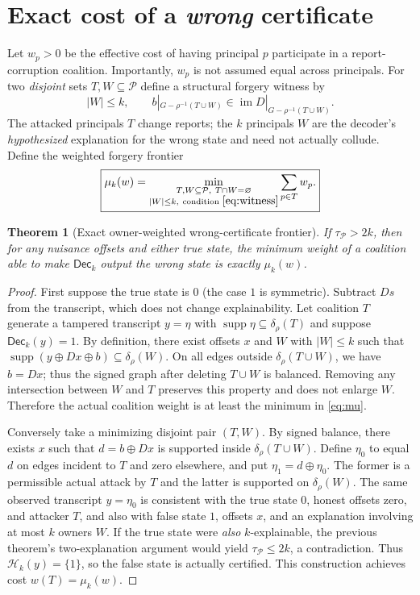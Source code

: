 \documentclass[10pt,a4paper]{article}
\newtheorem{theorem}{Theorem}
\newcommand{\Pc}{\mathcal P}
\newcommand{\supp}{\operatorname{supp}}
\newcommand{\Dec}{\mathsf{Dec}}
\newcommand{\deltaP}{\delta_\rho}
\begin{document}
\section{Exact cost of a \emph{wrong} certificate}
Let $w_p>0$ be the effective cost of having principal $p$ participate in a report-corruption coalition. Importantly, $w_p$ is not assumed equal across principals. For two \emph{disjoint} sets $T,W\subseteq\Pc$ define a structural forgery witness by
\begin{equation}\label{eq:witness}
 |W|\le k,\qquad b|_{G-\rho^{-1}(T\cup W)}\in\operatorname{im}D|_{G-\rho^{-1}(T\cup W)}.
\end{equation}
The attacked principals $T$ change reports; the $k$ principals $W$ are the decoder's \emph{hypothesized} explanation for the wrong state and need not actually collude. Define the weighted forgery frontier
\begin{equation}\label{eq:mu}
 \boxed{\mu_k(w)=\min_{\substack{T,W\subseteq\Pc,\ T\cap W=\varnothing\\ |W|\le k,\ \text{condition }\eqref{eq:witness}}}\sum_{p\in T}w_p.}
\end{equation}

\begin{theorem}[Exact owner-weighted wrong-certificate frontier]\label{thm:mu}
If $\tau_\Pc>2k$, then for any nuisance offsets and either true state, the minimum weight of a coalition able to make $\Dec_k$ output the \emph{wrong} state is exactly $\mu_k(w)$.
\end{theorem}
\begin{proof}
First suppose the true state is $0$ (the case $1$ is symmetric). Subtract $Ds$ from the transcript, which does not change explainability. Let coalition $T$ generate a tampered transcript $y=\eta$ with $\supp\eta\subseteq\deltaP(T)$ and suppose $\Dec_k(y)=1$. By definition, there exist offsets $x$ and $W$ with $|W|\le k$ such that $\supp(y\oplus Dx\oplus b)\subseteq\deltaP(W)$. On all edges outside $\deltaP(T\cup W)$, we have $b=Dx$; thus the signed graph after deleting $T\cup W$ is balanced. Removing any intersection between $W$ and $T$ preserves this property and does not enlarge $W$. Therefore the actual coalition weight is at least the minimum in \eqref{eq:mu}.\par
Conversely take a minimizing disjoint pair $(T,W)$. By signed balance, there exists $x$ such that $d=b\oplus Dx$ is supported inside $\deltaP(T\cup W)$. Define $\eta_0$ to equal $d$ on edges incident to $T$ and zero elsewhere, and put $\eta_1=d\oplus\eta_0$. The former is a permissible actual attack by $T$ and the latter is supported on $\deltaP(W)$. The same observed transcript $y=\eta_0$ is consistent with the true state $0$, honest offsets zero, and attacker $T$, and also with false state $1$, offsets $x$, and an explanation involving at most $k$ owners $W$. If the true state were \emph{also} $k$-explainable, the previous theorem's two-explanation argument would yield $\tau_\Pc\le2k$, a contradiction. Thus $\mathcal H_k(y)=\{1\}$, so the false state is actually certified. This construction achieves cost $w(T)=\mu_k(w)$.\end{proof}
\end{document}
